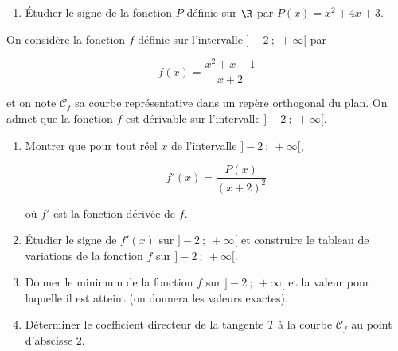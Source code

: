 \medskip

\begin{enumerate}
\item Étudier le signe de la fonction $P$ définie sur $\R$ par $P(x) = x^2 + 4x + 3$.


\end{enumerate}

On considère la fonction $f$ définie sur l'intervalle $]- 2~;~ +\infty[$ par

\[f(x) = \dfrac{x^2 +x - 1}{x + 2}\]

et on note $\mathcal{C}_f$ sa courbe représentative dans un repère orthogonal du plan. On admet que la fonction $f$ est dérivable sur l'intervalle $]- 2~;~ +\infty[$. 

\medskip

\begin{enumerate}[resume]
\item Montrer que pour tout réel $x$ de l'intervalle $]- 2~;~ +\infty[$,

\[f'(x) = \dfrac{P(x)}{(x + 2 )^2}\]

où $f'$ est la fonction dérivée de $f$.

\item Étudier le signe de $f'(x)$ sur $]- 2~;~ +\infty[$ et construire le tableau de variations de la fonction $f$ sur $]- 2~;~ +\infty[$.
\item Donner le minimum de la fonction $f$ sur $]- 2~;~ +\infty[$ et la valeur pour laquelle il est atteint (on donnera les valeurs exactes).
\item Déterminer le coefficient directeur de la tangente $T$ à la courbe $\mathcal{C}_f$ au point d'abscisse $2$.
\end{enumerate}
